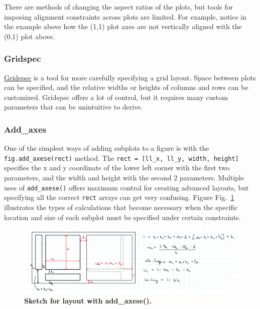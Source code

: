 \documentclass[12pt]{caltech_thesis}
\begin{document}
There are methods of changing the aspect ratios of the plots, but tools
for imposing alignment constraints across plots are limited. For
example, notice in the example above how the (1,1) plot axes are not
vertically aligned with the (0,1) plot above.

\hypertarget{gridspec}{%
\subsubsection{Gridspec}\label{gridspec}}

\href{https://matplotlib.org/stable/gallery/lines_bars_and_markers/scatter_hist.html\#sphx-glr-gallery-lines-bars-and-markers-scatter-hist-py}{Gridspec}
is a tool for more carefully specifying a grid layout. Space between
plots can be specified, and the relative widths or heights of columns
and rows can be customized. Gridspec offers a lot of control, but it
requires many custom parameters that can be unintuitive to derive.

\hypertarget{add_axes}{%
\subsubsection{Add\_axes}\label{add_axes}}

One of the simplest ways of adding subplots to a figure is with the
\texttt{fig.add\_axese(rect)} method. The
\texttt{rect\ =\ {[}ll\_x,\ ll\_y,\ width,\ height{]}} specifies the x
and y coordinate of the lower left corner with the first two parameters,
and the width and height with the second 2 parameters. Multiple uses of
\texttt{add\_axese()} offers maximum control for creating advanced
layouts, but specifying all the correct \texttt{rect} arrays can get
very confusing. Figure Fig.~\ref{fig:layout_sketch} illustrates the
types of calculations that become necessary when the specific location
and size of each subplot must be specified under certain constraints.

\hypertarget{fig:layout_sketch}{%
\begin{figure}
\centering
\includegraphics{chapter_05/figs_05/layout_sketch.png}
\caption[{Rough sketch for layout with add\_axese()}]{\textbf{Sketch for
layout with add\_axese().}}
\label{fig:layout_sketch}
\end{figure}
}
\end{document}
